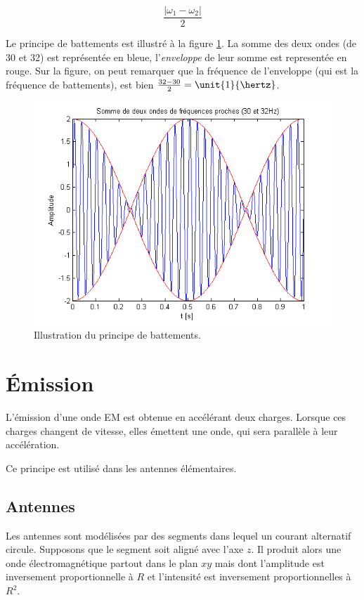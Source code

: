$$\frac{|\omega_1 - \omega_2|}{2}$$

Le principe de battements est illustré à la figure \ref{fig:battements}.
La somme des deux ondes (de \unit{30}{\hertz} et \unit{32}{\hertz})
est représentée en bleue, l'\emph{enveloppe} de leur somme est representée en rouge.
Sur la figure, on peut remarquer que la fréquence de l'enveloppe (qui est la
fréquence de battements), est bien $\frac{32-30}{2} = \unit{1}{\hertz}$.

\begin{figure}[ht!]
	\centering
	\includegraphics[scale=0.8]{battements.png}
	\caption{Illustration du principe de battements.}	
	\label{fig:battements}
\end{figure}

\section{Émission}
L'émission d'une onde EM est obtenue en accélérant deux charges.
Lorsque ces charges changent de vitesse, elles émettent une onde, qui sera
parallèle à leur accélération.

Ce principe est utilisé dans les antennes élémentaires.

\subsection{Antennes}
Les antennes sont modélisées par des segments dans lequel un courant
alternatif circule.
Supposons que le segment soit aligné avec l'axe $z$.
Il produit alors une onde électromagnétique partout dans le plan $xy$ mais
dont l'amplitude est inversement proportionnelle à $R$ et l'intensité
est inversement proportionnelles à $R^2$.


